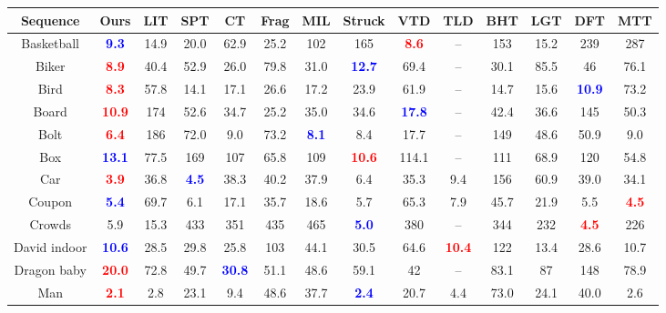 \documentclass[10pt,twocolumn,letterpaper]{article}
\begin{document}
\begin{table*}
\begin{center}
\begin{tabular}{|c||c|c|c|c|c|c|c|c|c|c|c|c|c|}
  \hline
  {\bf Sequence} & {\bf Ours} & {\bf LIT} & {\bf SPT} & {\bf CT} & {\bf Frag} & {\bf MIL} & {\bf Struck} & {\bf VTD} & {\bf TLD} & {\bf BHT} & {\bf LGT} & {\bf DFT} & {\bf MTT} \\
  \hline \hline
  Basketball & \textcolor{blue}{\bf 9.3} & 14.9 & 20.0 & 62.9 & 25.2 & 102 & 165 & \textcolor{red}{\bf 8.6} & -- & 153 & 15.2 & 239 & 287 \\
  Biker & \textcolor{red}{\bf 8.9} & 40.4 & 52.9 & 26.0 & 79.8 & 31.0 & \textcolor{blue}{\bf 12.7} & 69.4 & -- & 30.1 & 85.5 & 46 & 76.1 \\
  Bird & \textcolor{red}{\bf 8.3} & 57.8 & 14.1 & 17.1 & 26.6 & 17.2 & 23.9 & 61.9 & -- & 14.7 & 15.6 & \textcolor{blue}{\bf 10.9} & 73.2 \\
  Board & \textcolor{red}{\bf 10.9} & 174 & 52.6 & 34.7 & 25.2 & 35.0 & 34.6 & \textcolor{blue}{\bf 17.8} & -- & 42.4 & 36.6 & 145 & 50.3 \\
  Bolt & \textcolor{red}{\bf 6.4} & 186 & 72.0 & 9.0 & 73.2 & \textcolor{blue}{\bf 8.1} & 8.4 & 17.7 & -- & 149 & 48.6 & 50.9 & 9.0 \\
  Box & \textcolor{blue}{\bf 13.1} & 77.5 & 169 & 107 & 65.8 & 109 & 
  \textcolor{red}{\bf 10.6} & 114.1 & -- & 111 & 68.9 & 120 & 54.8 \\
  Car & \textcolor{red}{\bf 3.9} & 36.8 & \textcolor{blue}{\bf 4.5} & 38.3 & 40.2 & 37.9 & 6.4 & 35.3 & 9.4 & 156 & 60.9 & 39.0 & 34.1 \\
  Coupon & \textcolor{blue}{\bf 5.4} & 69.7 & 6.1 & 17.1 & 35.7 & 18.6 & 5.7 & 65.3 & 7.9 & 45.7 & 21.9 & 5.5 & \textcolor{red}{\bf 4.5} \\
  Crowds & 5.9 & 15.3 & 433 & 351 & 435 & 465 & \textcolor{blue}{\bf 5.0} & 380 & -- & 344 & 232 & \textcolor{red}{\bf 4.5} & 226 \\
  David indoor & \textcolor{blue}{\bf 10.6} & 28.5 & 29.8 & 25.8 & 103 & 44.1 & 30.5 & 64.6 & \textcolor{red}{\bf 10.4} & 122 & 13.4 & 28.6 & 10.7 \\
  Dragon baby & \textcolor{red}{\bf 20.0} & 72.8 & 49.7 & \textcolor{blue}{\bf 30.8} & 51.1 & 48.6 & 59.1 & 42 & -- & 83.1 & 87 & 148 & 78.9 \\
  Man & \textcolor{red}{\bf 2.1} & 2.8 & 23.1 & 9.4 & 48.6 & 37.7 & \textcolor{blue}{\bf 2.4} & 20.7 & 4.4 & 73.0 & 24.1 & 40.0 & 2.6 \\

\end{tabular}
\end{center}
\end{table*}
\end{document}
